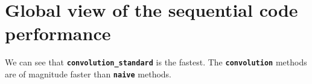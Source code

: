 \section{Global view of the sequential code performance}

We can see that \texttt{\textbf{convolution\_standard}} is the fastest.
The \texttt{\textbf{convolution}} methods are of magnitude faster
than \texttt{\textbf{naive}} methods.
